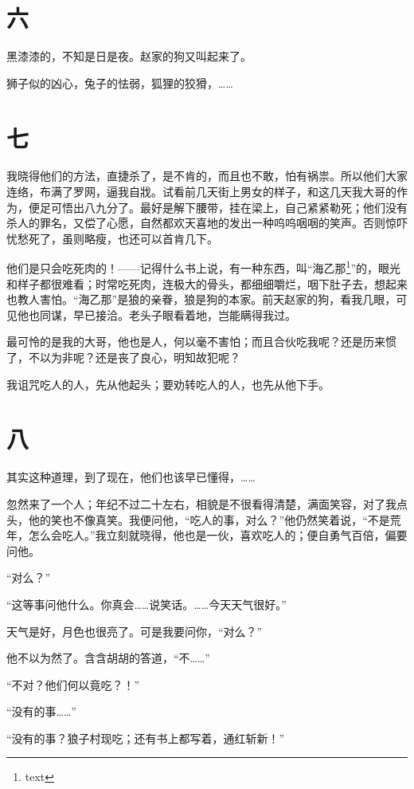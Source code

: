 \documentclass[12pt,UTF8]{ctexbook}
\begin{document}
\section{六}

黑漆漆的，不知是日是夜。赵家的狗又叫起来了。

狮子似的凶心，兔子的怯弱，狐狸的狡猾，……

\section{七}

我晓得他们的方法，直捷杀了，是不肯的，而且也不敢，怕有祸祟。所以他们大家连络，布满了罗网，逼我自戕。试看前几天街上男女的样子，和这几天我大哥的作为，便足可悟出八九分了。最好是解下腰带，挂在梁上，自己紧紧勒死；他们没有杀人的罪名，又偿了心愿，自然都欢天喜地的发出一种呜呜咽咽的笑声。否则惊吓忧愁死了，虽则略瘦，也还可以首肯几下。

他们是只会吃死肉的！——记得什么书上说，有一种东西，叫“海乙那\footnote{text}”的，眼光和样子都很难看；时常吃死肉，连极大的骨头，都细细嚼烂，咽下肚子去，想起来也教人害怕。“海乙那”是狼的亲眷，狼是狗的本家。前天赵家的狗，看我几眼，可见他也同谋，早已接洽。老头子眼看着地，岂能瞒得我过。

最可怜的是我的大哥，他也是人，何以毫不害怕；而且合伙吃我呢？还是历来惯了，不以为非呢？还是丧了良心，明知故犯呢？

我诅咒吃人的人，先从他起头；要劝转吃人的人，也先从他下手。

\section{八}

其实这种道理，到了现在，他们也该早已懂得，……

忽然来了一个人；年纪不过二十左右，相貌是不很看得清楚，满面笑容，对了我点头，他的笑也不像真笑。我便问他，“吃人的事，对么？”他仍然笑着说，“不是荒年，怎么会吃人。”我立刻就晓得，他也是一伙，喜欢吃人的；便自勇气百倍，偏要问他。

“对么？”

“这等事问他什么。你真会……说笑话。……今天天气很好。”

天气是好，月色也很亮了。可是我要问你，“对么？”

他不以为然了。含含胡胡的答道，“不……”

“不对？他们何以竟吃？！”

“没有的事……”

“没有的事？狼子村现吃；还有书上都写着，通红斩新！”
\end{document}
